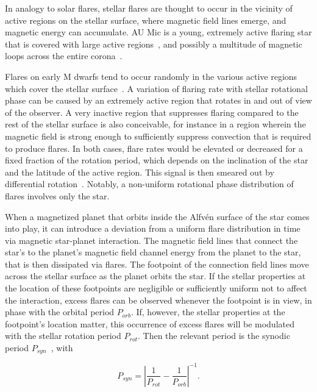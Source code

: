 \documentclass[fleqn,usenatbib]{mnras}%
\begin{document}
In analogy to solar flares, stellar flares are thought to occur in the vicinity of active regions on the stellar surface, where magnetic field lines emerge, and magnetic energy can accumulate. AU Mic is a young, extremely active flaring star that is covered with large active regions~\citep{linsky1994, kochukhov2020, plavchan2020}, and possibly a multitude of magnetic loops across the entire corona~\citep{cranmer2013}.


Flares on early M dwarfs tend to occur randomly in the various active regions which cover the stellar surface~\citep{doyle2018, doyle2019}. A variation of flaring rate with stellar rotational phase can be caused by an extremely active region that rotates in and out of view of the observer. A very inactive region that suppresses flaring compared to the rest of the stellar surface is also conceivable, for instance in a region wherein the magnetic field is strong enough to sufficiently suppress convection that is required to produce flares. In both cases, flare rates would be elevated or decreased for a fixed fraction of the rotation period, which depends on the inclination of the star and the latitude of the active region. This signal is then smeared out by differential rotation~\citep{howard2021evryflare}. Notably, a non-uniform rotational phase distribution of flares involves only the star. 

When a magnetized planet that orbits inside the Alfv\'en surface of the star comes into play, it can introduce a deviation from a uniform flare distribution in time via magnetic star-planet interaction. The magnetic field lines that connect the star's to the planet's magnetic field channel energy from the planet to the star, that is then dissipated via flares. The footpoint of the connection field lines move across the stellar surface as the planet orbits the star. If the stellar properties at the location of these footpoints are negligible or sufficiently uniform not to affect the interaction, excess flares can be observed whenever the footpoint is in view, in phase with the orbital period $P_{orb}$. If, however, the stellar properties at the footpoint's location matter, this occurrence of excess flares will be modulated with the stellar rotation period $P_{rot}$. Then the relevant period is the synodic period $P_{syn}$~\citep{fischer2019}, with

\begin{equation}
P_{syn} = \left|\dfrac{1}{P_{rot}} - \dfrac{1}{P_{orb}}\right|^{-1}.
\end{equation}
\end{document}
